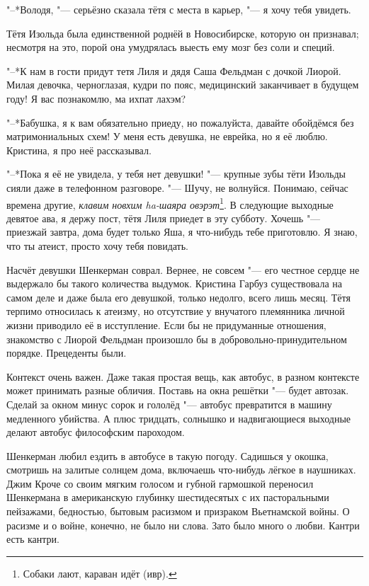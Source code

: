 "--*Володя, "--- серьёзно сказала тётя с места в карьер, "--- я хочу тебя увидеть.

Тётя Изольда была единственной роднёй в Новосибирске, которую он признавал;
несмотря на это, порой она умудрялась выесть ему мозг без соли и специй.

"--*К нам в гости придут тетя Лиля и дядя Саша Фельдман с дочкой Лиорой.
Милая девочка, черноглазая, кудри по пояс, медицинский заканчивает в будущем году!
Я вас познакомлю, ма ихпат лахэм?

"--*Бабушка, я к вам обязательно приеду, но пожалуйста, давайте обойдёмся без матримониальных схем!
У меня есть девушка, не еврейка, но я её люблю.
Кристина, я про неё рассказывал.

"--*Пока я её не увидела, у тебя нет девушки! "--- крупные зубы тёти Изольды сияли даже в телефонном разговоре.
"--- Шучу, не волнуйся.
Понимаю, сейчас времена другие, \textit{клавим новхим ha-шаяра овэрэт}\footnote{Собаки лают, караван идёт (ивр).}.
В следующие выходные девятое ава, я держу пост, тётя Лиля приедет в эту субботу.
Хочешь "--- приезжай завтра, дома будет только Яша, я что-нибудь тебе приготовлю.
Я знаю, что ты атеист, просто хочу тебя повидать.

Насчёт девушки Шенкерман соврал.
Вернее, не совсем "--- его честное сердце не выдержало бы такого количества выдумок.
Кристина Гарбуз существовала на самом деле и даже была его девушкой, только недолго, всего лишь месяц.
Тётя терпимо относилась к атеизму, но отсутствие у внучатого племянника личной жизни приводило её в исступление.
Если бы не придуманные отношения, знакомство с Лиорой Фельдман произошло бы в добровольно-принудительном порядке.
Прецеденты были.

\asterism

\label{Fri_2012_07_20}

Контекст очень важен.
Даже такая простая вещь, как автобус, в разном контексте может принимать разные обличия.
Поставь на окна решётки "--- будет автозак.
Сделай за окном минус сорок и гололёд "--- автобус превратится в машину медленного убийства.
А плюс тридцать, солнышко и надвигающиеся выходные делают автобус философским пароходом.

Шенкерман любил ездить в автобусе в такую погоду.
Садишься у окошка, смотришь на залитые солнцем дома, включаешь что-нибудь лёгкое в наушниках.
Джим Кроче со своим мягким голосом и губной гармошкой переносил Шенкермана в американскую глубинку шестидесятых с их пасторальными пейзажами, бедностью, бытовым расизмом и призраком Вьетнамской войны.
О расизме и о войне, конечно, не было ни слова.
Зато было много о любви.
Кантри есть кантри.

